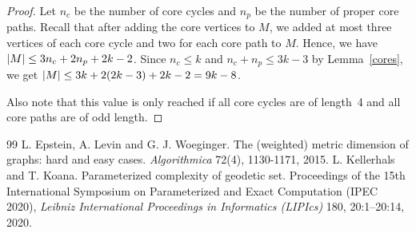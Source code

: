 \documentclass[10pt,a4paper]{amsart}
\theoremstyle{plain}
\theoremstyle{definition}
\DeclarePairedDelimiter\abs{\lvert}{\rvert}
\begin{document}
\begin{proof}
Let $n_c$ be the number of core cycles and $n_p$ be the number of proper core paths. Recall that after adding the core vertices to $M$, we added at most three vertices of each core cycle and two for each core path to $M$. Hence, we have $\abs{M} \leq 3n_c + 2n_p + 2k-2$. Since $n_c \leq k$ and $n_c + n_p \leq 3k-3$ by Lemma~\ref{cores}, we get $\abs{M} \leq 3k + 2(2k-3) + 2k-2 = 9k-8$.

Also note that this value is only reached if all core cycles are of length~4 and all core paths are of odd length.
\end{proof}

\begin{thebibliography}{99}
 L. Epstein, A. Levin and G. J. Woeginger. The (weighted) metric dimension of graphs: hard and easy cases. \emph{Algorithmica} 72(4), 1130-1171, 2015.
 L. Kellerhals and T. Koana. Parameterized complexity of geodetic set. Proceedings of the 15th International Symposium on Parameterized and Exact Computation (IPEC 2020), \emph{Leibniz International Proceedings in Informatics (LIPIcs)} 180, 20:1--20:14, 2020.
\end{thebibliography}
\end{document}
